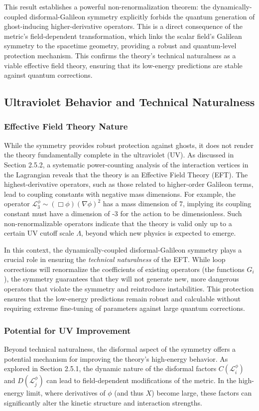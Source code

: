 \documentclass[twocolumn]{aastex631}
\begin{document}
This result establishes a powerful non-renormalization theorem: the dynamically-coupled disformal-Galileon symmetry explicitly forbids the quantum generation of ghost-inducing higher-derivative operators. This is a direct consequence of the metric's field-dependent transformation, which links the scalar field's Galilean symmetry to the spacetime geometry, providing a robust and quantum-level protection mechanism. This confirms the theory's technical naturalness as a viable effective field theory, ensuring that its low-energy predictions are stable against quantum corrections.

\subsection{Ultraviolet Behavior and Technical Naturalness}

\subsubsection{Effective Field Theory Nature}
While the symmetry provides robust protection against ghosts, it does not render the theory fundamentally complete in the ultraviolet (UV). As discussed in Section 2.5.2, a systematic power-counting analysis of the interaction vertices in the Lagrangian reveals that the theory is an Effective Field Theory (EFT). The highest-derivative operators, such as those related to higher-order Galileon terms, lead to coupling constants with negative mass dimensions. For example, the operator $\mathcal{L}_3^\phi \sim (\Box \phi) (\nabla\phi)^2$ has a mass dimension of 7, implying its coupling constant must have a dimension of -3 for the action to be dimensionless. Such non-renormalizable operators indicate that the theory is valid only up to a certain UV cutoff scale $\Lambda$, beyond which new physics is expected to emerge.

In this context, the dynamically-coupled disformal-Galileon symmetry plays a crucial role in ensuring the \textit{technical naturalness} of the EFT. While loop corrections will renormalize the coefficients of existing operators (the functions $G_i$), the symmetry guarantees that they will not generate new, more dangerous operators that violate the symmetry and reintroduce instabilities. This protection ensures that the low-energy predictions remain robust and calculable without requiring extreme fine-tuning of parameters against large quantum corrections.

\subsubsection{Potential for UV Improvement}
Beyond technical naturalness, the disformal aspect of the symmetry offers a potential mechanism for improving the theory's high-energy behavior. As explored in Section 2.5.1, the dynamic nature of the disformal factors $C(\mathcal{L}_i^\phi)$ and $D(\mathcal{L}_j^\phi)$ can lead to field-dependent modifications of the metric. In the high-energy limit, where derivatives of $\phi$ (and thus $X$) become large, these factors can significantly alter the kinetic structure and interaction strengths.
\end{document}
